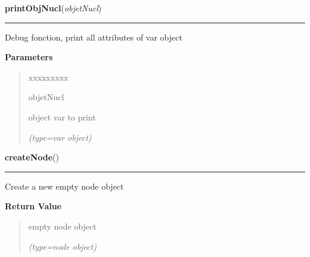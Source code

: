     \label{script-phyloFixedVar:printObjNucl}

    \vspace{0.5ex}

\hspace{.8\funcindent}\begin{boxedminipage}{\funcwidth}

    \raggedright \textbf{printObjNucl}(\textit{objetNucl})

    \vspace{-1.5ex}

    \rule{\textwidth}{0.5\fboxrule}
\setlength{\parskip}{2ex}
    Debug fonction, print all attributes of var object

\setlength{\parskip}{1ex}
      \textbf{Parameters}
      \vspace{-1ex}

      \begin{quote}
        \begin{Ventry}{xxxxxxxxx}

          \item[objetNucl]

          object var to print

            {\it (type=var object)}

        \end{Ventry}

      \end{quote}

    \end{boxedminipage}

    \label{script-phyloFixedVar:createNode}

    \vspace{0.5ex}

\hspace{.8\funcindent}\begin{boxedminipage}{\funcwidth}

    \raggedright \textbf{createNode}()

    \vspace{-1.5ex}

    \rule{\textwidth}{0.5\fboxrule}
\setlength{\parskip}{2ex}
    Create a new empty node object

\setlength{\parskip}{1ex}
      \textbf{Return Value}
    \vspace{-1ex}

      \begin{quote}
      empty node object

      {\it (type=node object)}

      \end{quote}

    \end{boxedminipage}

